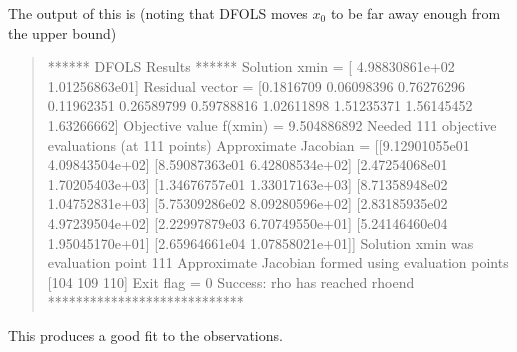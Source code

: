 \documentclass[letterpaper,10pt,english]{sphinxmanual}
\begin{document}
\sphinxAtStartPar
The output of this is (noting that DFO\sphinxhyphen{}LS moves \(x_0\) to be far away enough from the upper bound)
\begin{quote}

\begin{sphinxVerbatim}[commandchars=\\\{\}]
****** DFO\PYGZhy{}LS Results ******
Solution xmin = [ 4.98830861e+02 \PYGZhy{}1.01256863e\PYGZhy{}01]
Residual vector = [\PYGZhy{}0.1816709   0.06098396  0.76276296  0.11962351 \PYGZhy{}0.26589799 \PYGZhy{}0.59788816
 \PYGZhy{}1.02611898 \PYGZhy{}1.51235371 \PYGZhy{}1.56145452 \PYGZhy{}1.63266662]
Objective value f(xmin) = 9.504886892
Needed 111 objective evaluations (at 111 points)
Approximate Jacobian = [[\PYGZhy{}9.12901055e\PYGZhy{}01 \PYGZhy{}4.09843504e+02]
 [\PYGZhy{}8.59087363e\PYGZhy{}01 \PYGZhy{}6.42808534e+02]
 [\PYGZhy{}2.47254068e\PYGZhy{}01 \PYGZhy{}1.70205403e+03]
 [\PYGZhy{}1.34676757e\PYGZhy{}01 \PYGZhy{}1.33017163e+03]
 [\PYGZhy{}8.71358948e\PYGZhy{}02 \PYGZhy{}1.04752831e+03]
 [\PYGZhy{}5.75309286e\PYGZhy{}02 \PYGZhy{}8.09280596e+02]
 [\PYGZhy{}2.83185935e\PYGZhy{}02 \PYGZhy{}4.97239504e+02]
 [\PYGZhy{}2.22997879e\PYGZhy{}03 \PYGZhy{}6.70749550e+01]
 [\PYGZhy{}5.24146460e\PYGZhy{}04 \PYGZhy{}1.95045170e+01]
 [\PYGZhy{}2.65964661e\PYGZhy{}04 \PYGZhy{}1.07858021e+01]]
Solution xmin was evaluation point 111
Approximate Jacobian formed using evaluation points [104 109 110]
Exit flag = 0
Success: rho has reached rhoend
****************************
\end{sphinxVerbatim}
\end{quote}

\sphinxAtStartPar
This produces a good fit to the observations.

\end{document}
